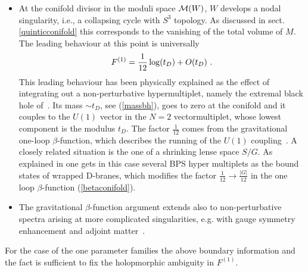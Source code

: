 \documentclass[12pt]{article}
\begin{document}
\begin{itemize}
\item At the conifold divisor in the moduli space  ${\cal M}(W)$, $W$
develops a nodal singularity, i.e., a collapsing  cycle
with $S^3$ topology. As discussed in sect. \ref{quinticconifold} this
corresponds to the vanishing of the total volume of $M$. The leading
behaviour at this point is universally~\cite{Hosono:1994ax}
\begin{equation}
F^{(1)}= {1\over 12} \log(t_D)+O(t_D)\ .
\label{betaconifold}
\end{equation}
This leading behaviour has been physically explained as the effect of integrating out
a non-perturbative hypermultiplet, namely the  extremal black hole of~\cite{Strominger:1995cz}.
Its mass $\sim t_D$, see (\ref{massbh}), goes to zero at the conifold and it couples to
the $U(1)$ vector in the $N=2$ vectormultiplet, whose lowest component is the modulus $t_D$.
The factor $\frac{1}{12}$ comes from the gravitational one-loop $\beta$-function,  which describes the
running of the $U(1)$ coupling~\cite{Vafa:1995ta}.
A closely related  situation is the one of a shrinking lense space $S/G$.
As explained in \cite{GVbfg} one gets in this case several BPS hyper multiplets as the
bound states of wrapped D-branes, which modifies the  factor $\frac{1}{12}\rightarrow \frac{|G|}{12}$
in the one loop $\beta$-function (\ref{betaconifold}).
\item The gravitational $\beta$-function argument extends also to non-perturbative spectra arising at more
complicated singularities, e.g. with gauge symmetry enhancement and adjoint
matter~\cite{Klemm:1995kj}.
\end{itemize}
For the case of the one parameter families the above boundary information and the fact is
sufficient to fix the holopmorphic ambiguity in $F^{(1)}$.
\end{document}
